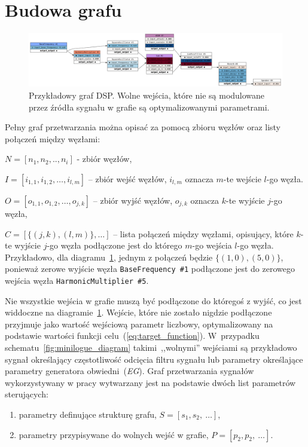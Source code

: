 \section{Budowa grafu}

\begin{figure}[H]\label{fig:example_graph_definition_chapter}
    \centering
    \includegraphics[width=0.9\linewidth]{rys05/luthier_simple_analog.png}
    \caption{
      Przykładowy graf DSP\@. Wolne wejścia, które nie są modulowane przez
      źródła sygnału w grafie są optymalizowanymi parametrami.
    }
\end{figure}


Pełny graf przetwarzania można opisać za pomocą zbioru węzłów oraz
listy połączeń między węzłami:

$N = [n_1, n_2, .., n_i]$ - zbiór węzłów,

$I = [ i_{1, 1}, i_{1, 2}, \ldots, i_{l, m} ]$ -- zbiór wejść węzłów, $i_{l, m}$ oznacza $m$-te wejście $l$-go węzła.

$O = [ o_{1,1}, o_{1,2}, \ldots, o_{j, k} ]$ -- zbiór wyjść węzłów, $o_{j, k}$ oznacza $k$-te wyjście $j$-go węzła,


$C = [ \{ (j, k), (l, m) \}, \ldots ] $ -- lista połączeń między węzłami, opisujący, które 
$k$-te wyjście $j$-go węzła podłączone jest do którego $m$-go wejścia $l$-go węzła. Przykładowo,
dla diagramu~\ref{fig:example_graph_definition_chapter}, jednym z połączeń będzie $\{(1, 0), (5, 0)\}$,
ponieważ zerowe wyjście węzła \texttt{BaseFrequency~\#1} podłączone jest do zerowego
wejścia węzła \texttt{HarmonicMultiplier~\#5}.

Nie wszystkie wejścia w grafie muszą być podłączone do któregoś z wyjść, 
co jest widdoczne na diagramie~\ref{fig:example_graph_definition_chapter}.
Wejście, które nie zostało nigdzie podłączone przyjmuje jako wartość wejściową parametr 
liczbowy, optymalizowany na podstawie wartości funkcji celu~(\ref{eq:target_function}).
W~przypadku schematu~\ref{fig:minilogue_diagram} takimi~,,wolnymi'' wejściami są przykładowo
sygnał określający częstotliwość odcięcia filtru sygnału lub parametry określające parametry
generatora obwiedni~(\textit{EG}).
Graf przetwarzania sygnałów wykorzystywany w pracy wytwarzany
jest na podstawie dwóch list parametrów sterujących:
\begin{enumerate}
  \item parametry definujące strukturę grafu, $S = [s_1, s_2,~\ldots]$,
  \item parametry przypisywane do wolnych wejść w grafie, $P = [p_2, p_2,~\ldots]$.
\end{enumerate}



